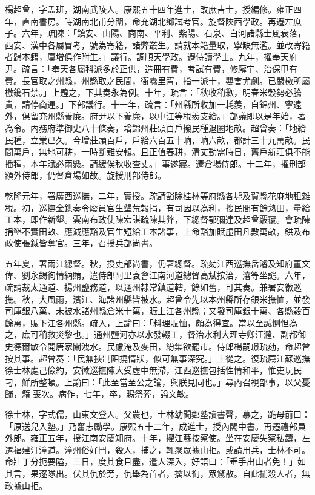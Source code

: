 \begin{pinyinscope}
楊超曾，字孟班，湖南武陵人。康熙五十四年進士，改庶吉士，授編修。雍正四年，直南書房。時湖南北甫分闈，命充湖北鄉試考官。旋督陜西學政。再遷左庶子。六年，疏陳：「鎮安、山陽、商南、平利、紫陽、石泉、白河諸縣士風衰落，西安、漢中各屬冒考，號為寄籍，諸弊叢生。請就本籍量取，寧缺無濫。並改寄籍者歸本籍，廩增俱作附生。」議行。調順天學政。遷侍讀學士。九年，擢奉天府尹。疏言：「奉天各屬科派多於正供，造冊有費，考試有費，修廨宇、治保甲有費。長官取之州縣，州縣取之民間，衙蠹里胥，指一派十，嬰害尤劇。已嚴檄所屬檄鑱石禁。」上韙之，下其奏永為例。十年，疏言：「秋收稍歉，明春米穀勢必騰貴，請停商運。」下部議行。十一年，疏言：「州縣所收加一耗羨，自錦州、寧遠外，俱留充州縣養廉。府尹以下養廉，以中江等稅羨支給。」部議即以是年始，著為令。內務府準御史八十條奏，增錦州莊頭百戶撥民種退圈地畝。超曾奏：「地給民種，立業已久。今增莊頭百戶，戶給六百五十晌，晌六畝，都計三十九萬畝。民間萬戶，無地可耕，一時斷難安輯。且正值春耕，清丈動需時日，舊戶新莊俱不能播種，本年賦必兩懸。請緩俟秋收查丈。」事遂寢。遷倉場侍郎。十二年，擢刑部額外侍郎，仍督倉場如故。旋授刑部侍郎。

乾隆元年，署廣西巡撫，二年，實授。疏請豁除桂林等府縣各墟及賀縣花麻地租雜稅。初，巡撫金鉷奏令廢員官生墾荒報捐，有司因以為利，搜民間有餘熟田，量給工本，即作新墾。雲南布政使陳宏謀疏陳其弊，下總督鄂彌達及超曾覈覆。會疏陳捐墾不實田畝、應減應豁及官生短給工本諸事，上命豁加賦虛田凡數萬畝，鉷及布政使張鉞皆奪官。三年，召授兵部尚書。

五年夏，署兩江總督。秋，授吏部尚書，仍署總督。疏劾江西巡撫岳濬及知府董文偉、劉永錫徇情納賄，遣侍郎阿里袞會江南河道總督高斌按治，濬等坐譴。六年，疏請裁太通道、揚州鹽務道，以通州隸常鎮道轄，餘如舊，可其奏。兼署安徽巡撫。秋，大風雨，濱江、海諸州縣皆被水。超曾令先以本州縣所存銀米撫恤，並發司庫銀八萬、未被水諸州縣倉米十萬，賑上江各州縣；又發司庫銀十萬、各縣穀百餘萬，賑下江各州縣。疏入，上諭曰：「料理賑恤，頗為得宜。當以至誠惻怛為之，庶可稍救災黎也。」通州鹽河亦以水發輟工，督治水利大理寺卿汪漋、副都御史德爾敏令開唐家閘洩水。民慮淹及麥田，紛集欲罷巿。侍郎楊嗣璟疏劾，命超曾按其事。超曾奏：「民無挾制阻撓情狀，似可無事深究。」上從之。復疏薦江蘇巡撫徐士林處己儉約，安徽巡撫陳大受虛中無滯，江西巡撫包括性情和平，惟吏玩民刁，鮮所整頓。上諭曰：「此至當至公之論，與朕見同也。」尋內召視部事，以父憂歸，籍喪次。病作，七年，卒，賜祭葬，謚文敏。

徐士林，字式儒，山東文登人。父農也，士林幼聞鄰塾讀書聲，慕之，跪母前曰：「原送兒入塾。」乃奮志勵學。康熙五十二年，成進士，授內閣中書。再遷禮部員外郎。雍正五年，授江南安慶知府。十年，擢江蘇按察使。坐在安慶失察私鑄，左遷福建汀漳道。漳州俗好鬥，殺人，捕之，輒聚眾據山拒。或請用兵，士林不可。命壯丁分扼要隘，三日，度其食且盡，遣人深入，好語曰：「垂手出山者免！」如其言，果逐隊出。伏其仇於旁，仇舉為首者，擒以徇，眾驚散。自此捕殺人者，無敢據山拒。


\end{pinyinscope}
